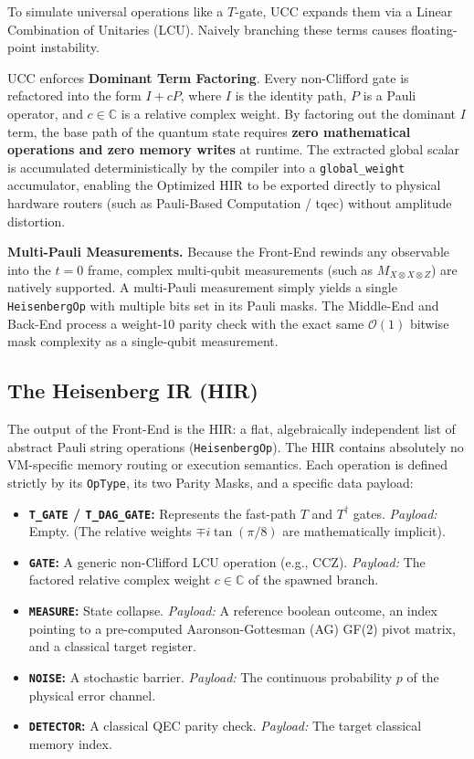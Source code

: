 \documentclass[11pt]{article}
\begin{document}
\begin{tcolorbox}[colback=blue!5,colframe=blue!40!black,title=Dominant Term Factoring]
To simulate universal operations like a $T$-gate, UCC expands them via a Linear Combination of Unitaries (LCU). Naively branching these terms causes floating-point instability.

UCC enforces \textbf{Dominant Term Factoring}. Every non-Clifford gate is refactored into the form $I + c P$, where $I$ is the identity path, $P$ is a Pauli operator, and $c \in \mathbb{C}$ is a relative complex weight. By factoring out the dominant $I$ term, the base path of the quantum state requires \textbf{zero mathematical operations and zero memory writes} at runtime. The extracted global scalar is accumulated deterministically by the compiler into a \texttt{global\_weight} accumulator, enabling the Optimized HIR to be exported directly to physical hardware routers (such as Pauli-Based Computation / tqec) without amplitude distortion.
\end{tcolorbox}

\textbf{Multi-Pauli Measurements.} Because the Front-End rewinds any observable into the $t=0$ frame, complex multi-qubit measurements (such as $M_{X \otimes X \otimes Z}$) are natively supported. A multi-Pauli measurement simply yields a single \texttt{HeisenbergOp} with multiple bits set in its Pauli masks. The Middle-End and Back-End process a weight-10 parity check with the exact same $\mathcal{O}(1)$ bitwise mask complexity as a single-qubit measurement.

\subsection{The Heisenberg IR (HIR)}
The output of the Front-End is the HIR: a flat, algebraically independent list of abstract Pauli string operations (\texttt{HeisenbergOp}). The HIR contains absolutely no VM-specific memory routing or execution semantics. Each operation is defined strictly by its \texttt{OpType}, its two Parity Masks, and a specific data payload:

\begin{itemize}
    \item \textbf{\texttt{T\_GATE} / \texttt{T\_DAG\_GATE}:} Represents the fast-path $T$ and $T^\dagger$ gates. \textit{Payload:} Empty. (The relative weights $\mp i \tan(\pi/8)$ are mathematically implicit).
    \item \textbf{\texttt{GATE}:} A generic non-Clifford LCU operation (e.g., CCZ). \textit{Payload:} The factored relative complex weight $c \in \mathbb{C}$ of the spawned branch.
    \item \textbf{\texttt{MEASURE}:} State collapse. \textit{Payload:} A reference boolean outcome, an index pointing to a pre-computed Aaronson-Gottesman (AG) GF(2) pivot matrix, and a classical target register.
    \item \textbf{\texttt{NOISE}:} A stochastic barrier. \textit{Payload:} The continuous probability $p$ of the physical error channel.
    \item \textbf{\texttt{DETECTOR}:} A classical QEC parity check. \textit{Payload:} The target classical memory index.
\end{itemize}
\end{document}

